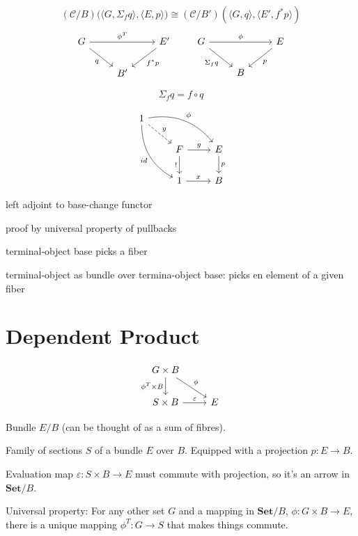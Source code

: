\documentclass[DaoFP]{subfiles}
\begin{document}
\[ (\mathcal{C}/B) \big(\langle G, \Sigma_f q\rangle , \langle E, p\rangle \big)  \cong   (\mathcal{C}/B') (\langle G, q \rangle , \langle E', f^* p\rangle )\]
\[
\begin{tikzcd}
 G
 \arrow[rr, "\phi^T"]
 \arrow[rd, "q"']
 && E'
 \arrow[ld, "f^* p"]
 \\
 & B'
  \end{tikzcd}
 \hspace{20pt}
 \begin{tikzcd}
 G
 \arrow[rr, "\phi"]
 \arrow[rd, "\Sigma_f q"']
 &&E
 \arrow[dl, "p"]
 \\
 &B
  \end{tikzcd}
\]

\[ \Sigma_f q = f \circ q \]


\[
 \begin{tikzcd}
 1
 \arrow[dr, dashed, "y"]
 \arrow[drr, bend left, "\phi"]
 \arrow[ddr, bend right, "id"']
 \\
 &F
 \arrow[r, "g"]
 \arrow[d, "!"']
 &E
 \arrow[d, "p"]
 \\
 &1
 \arrow[r, "x"]
 &B
  \end{tikzcd}
\]


left adjoint to base-change functor

proof by universal property of pullbacks

terminal-object base picks a fiber

terminal-object as bundle over termina-object base: picks en element of a given fiber


\section{Dependent Product}

\[
 \begin{tikzcd}
 G \times B
 \arrow[d, "\phi^T \times B"']
 \arrow[dr, "\phi"]
 \\
 S \times B
 \arrow[r, "\varepsilon"]
 &E
  \end{tikzcd}
\]


Bundle $E/B$ (can be thought of as a sum of fibres).

Family of sections $S$ of a bundle $E$ over $B$. Equipped with a projection $p \colon E \to B$.

Evaluation map $\varepsilon \colon S \times B \to E$ must commute with projection, so it's an arrow in $\mathbf{Set}/B$.

Universal property: For any other set $G$ and a mapping in $\mathbf{Set}/B$,  $\phi \colon G \times B \to E$, there is a unique mapping $\phi^T \colon G \to S$ that makes things commute.
\end{document}
